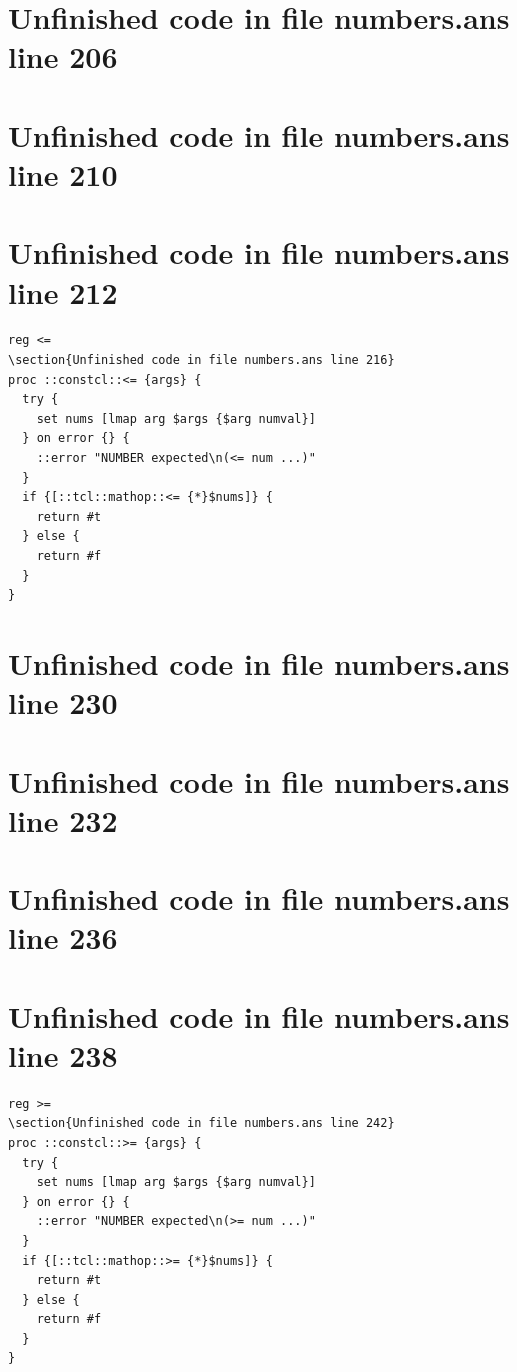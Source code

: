 \documentclass[twoside,9pt]{report}
\begin{document}
\section{Unfinished code in file numbers.ans line 206}
\section{Unfinished code in file numbers.ans line 210}
\section{Unfinished code in file numbers.ans line 212}
\index{<=}
\begin{lstlisting}
reg <=
\section{Unfinished code in file numbers.ans line 216}
proc ::constcl::<= {args} {
  try {
    set nums [lmap arg $args {$arg numval}]
  } on error {} {
    ::error "NUMBER expected\n(<= num ...)"
  }
  if {[::tcl::mathop::<= {*}$nums]} {
    return #t
  } else {
    return #f
  }
}
\end{lstlisting}
\section{Unfinished code in file numbers.ans line 230}
\section{Unfinished code in file numbers.ans line 232}
\section{Unfinished code in file numbers.ans line 236}
\section{Unfinished code in file numbers.ans line 238}
\index{>=}
\begin{lstlisting}
reg >=
\section{Unfinished code in file numbers.ans line 242}
proc ::constcl::>= {args} {
  try {
    set nums [lmap arg $args {$arg numval}]
  } on error {} {
    ::error "NUMBER expected\n(>= num ...)"
  }
  if {[::tcl::mathop::>= {*}$nums]} {
    return #t
  } else {
    return #f
  }
}
\end{lstlisting}
\end{document}
